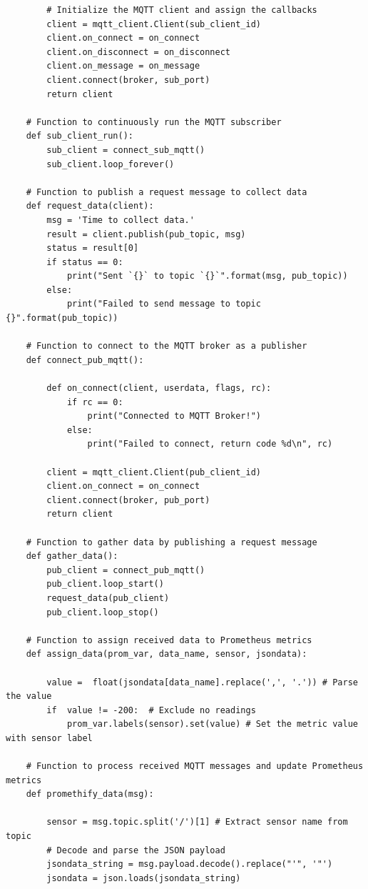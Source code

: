 \begin{verbatim}
        # Initialize the MQTT client and assign the callbacks
        client = mqtt_client.Client(sub_client_id)
        client.on_connect = on_connect
        client.on_disconnect = on_disconnect
        client.on_message = on_message
        client.connect(broker, sub_port)
        return client

    # Function to continuously run the MQTT subscriber
    def sub_client_run():
        sub_client = connect_sub_mqtt()
        sub_client.loop_forever()

    # Function to publish a request message to collect data
    def request_data(client):
        msg = 'Time to collect data.'
        result = client.publish(pub_topic, msg)
        status = result[0]
        if status == 0:
            print("Sent `{}` to topic `{}`".format(msg, pub_topic))
        else:
            print("Failed to send message to topic {}".format(pub_topic))

    # Function to connect to the MQTT broker as a publisher
    def connect_pub_mqtt():

        def on_connect(client, userdata, flags, rc):
            if rc == 0:
                print("Connected to MQTT Broker!")
            else:
                print("Failed to connect, return code %d\n", rc)

        client = mqtt_client.Client(pub_client_id)
        client.on_connect = on_connect
        client.connect(broker, pub_port)
        return client

    # Function to gather data by publishing a request message
    def gather_data():
        pub_client = connect_pub_mqtt()
        pub_client.loop_start()
        request_data(pub_client)
        pub_client.loop_stop()

    # Function to assign received data to Prometheus metrics
    def assign_data(prom_var, data_name, sensor, jsondata):

        value =  float(jsondata[data_name].replace(',', '.')) # Parse the value
        if  value != -200:  # Exclude no readings
            prom_var.labels(sensor).set(value) # Set the metric value with sensor label  

    # Function to process received MQTT messages and update Prometheus metrics
    def promethify_data(msg):

        sensor = msg.topic.split('/')[1] # Extract sensor name from topic
        # Decode and parse the JSON payload
        jsondata_string = msg.payload.decode().replace("'", '"') 
        jsondata = json.loads(jsondata_string)


\end{verbatim}
